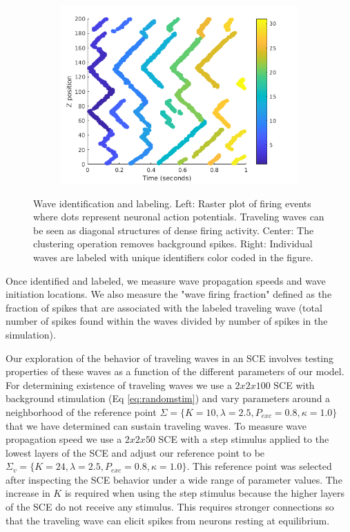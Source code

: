 \documentclass[12pt]{article}
\begin{document}
\begin{figure}[!htb]
\begin{subfigure}{0.33\textwidth}
  \includegraphics[width=\textwidth]{fig/2x2_wave_IDs}
 \end{subfigure}%
 \caption{Wave identification and labeling. Left: Raster plot of firing events where dots represent neuronal action potentials. 
          Traveling waves can be seen as diagonal structures of dense firing activity. 
          Center: The clustering operation removes background spikes. 
          Right: Individual waves are labeled with unique identifiers color coded in the figure.}
 \label{fig:wave_analysis}
\end{figure}
\FloatBarrier
Once identified and labeled, we measure wave propagation speeds and wave initiation locations. 
We also measure the "wave firing fraction" defined as the fraction of spikes that are associated with the labeled traveling wave (total number of spikes found within the waves divided by number of spikes in the simulation). 

Our exploration of the behavior of traveling waves in an SCE involves testing properties of these waves as a function of the different parameters of our model.
For determining existence of traveling waves we use a \color{red}$2x2x100$ SCE \color{black} with background stimulation (Eq \ref{eq:randomstim}) and vary parameters around a neighborhood of the reference point $\Sigma = \{K=10,\lambda=2.5,P_{exc}=0.8,\kappa=1.0 \}$ that we have determined can sustain traveling waves.
\color{red}To measure wave propagation speed we use a $2x2x50$ SCE with \color{black} a step stimulus applied to the lowest layers of the SCE and adjust our reference point to be $\Sigma_v = \{K=24,\lambda=2.5,P_{exc}=0.8,\kappa=1.0 \}$.
\color{red}This reference point was selected after inspecting the SCE behavior under a wide range of parameter values\color{black}.
The increase in $K$ is required when using the step stimulus because the higher layers of the SCE do not receive any stimulus.
This requires stronger connections so that the traveling wave can elicit spikes from neurons resting at equilibrium.
\FloatBarrier
\end{document}
